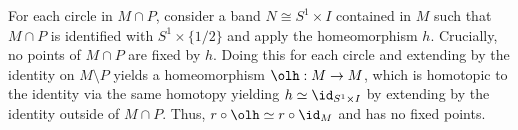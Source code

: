\begin{homework}[e]
\begin{prf}
    For each circle in $M\cap P$, consider a band $N \cong S^1 \times I$ contained in $M$ such that $M\cap P$ is identified with $S^1 \times \{1/2\}$ and apply the homeomorphism $h$. Crucially, no points of $M\cap P$ are fixed by $h$. Doing this for each circle and extending by the identity on $M \setminus P$ yields a homeomorphism $\olh:M\to M$, which is homotopic to the identity via the same homotopy yielding $h \simeq \id_{S^1\times I}$ by extending by the identity outside of $M\cap P$. Thus, $r\circ \olh \simeq r\circ \id_M$ and has no fixed points.
  \end{prf}
\end{homework} 

